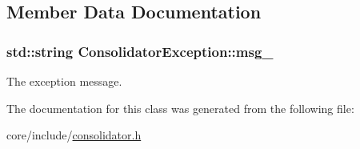 \subsection{Member Data Documentation}
\hypertarget{classConsolidatorException_a14ad835f359c30fd8e13f7c76c928a70}{}
\subsubsection[{msg\+\_\+}]{\setlength{\rightskip}{0pt plus 5cm}std\+::string Consolidator\+Exception\+::msg\+\_\+\hspace{0.3cm}{\ttfamily [private]}}\label{classConsolidatorException_a14ad835f359c30fd8e13f7c76c928a70}
The exception message. 

The documentation for this class was generated from the following file\+:\begin{DoxyCompactItemize}
\item 
core/include/\hyperlink{consolidator_8h}{consolidator.\+h}\end{DoxyCompactItemize}

